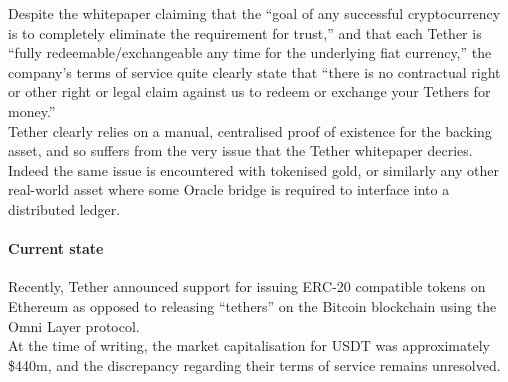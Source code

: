 Despite the whitepaper claiming that the ``goal of any successful cryptocurrency is to completely eliminate the requirement for trust,'' and that each Tether is ``fully redeemable/exchangeable any time for the underlying fiat currency,'' the company's terms of service quite clearly state that ``there is no contractual right or other right or legal claim against us to redeem or exchange your Tethers for money.'' \\

\noindent Tether clearly relies on a manual, centralised proof of existence for the backing asset, and so suffers from the very issue that the Tether whitepaper decries. Indeed the same issue is encountered with tokenised gold, or similarly any other real-world asset where some Oracle bridge is required to interface into a distributed ledger.

\paragraph{Current state}

Recently, Tether announced support for issuing ERC-20 compatible tokens on Ethereum as opposed to releasing ``tethers'' on the Bitcoin blockchain using the Omni Layer protocol. \\

\noindent At the time of writing, the market capitalisation for USDT was approximately \$440m, and the discrepancy regarding their terms of service remains unresolved. \\










\pagebreak